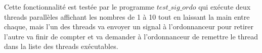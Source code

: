 	Cette fonctionnalité est testée par le programme
        $test\_sig\_ordo$ qui exécute deux threads parallèles
        affichant les nombres de 1 à 10 tout en laissant la main entre
        chaque, mais l'un des threads va envoyer un signal à
        l'ordonnanceur pour retirer l'autre va finir de compter et va
        demander à l'ordonnanceur de remettre le thread dans la liste
        des threads exécutables.\\
